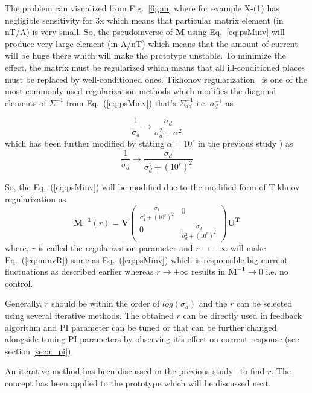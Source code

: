 The problem can visualized from Fig.~\ref{fig:m} where for example X-(1) has negligible sensitivity for 3x which means that particular matrix element (in nT/A) is very small. So, the pseudoinverse of $\bm{M}$ using Eq.~\ref{eq:psMinv} will produce very large element (in A/nT) which means that the amount of current will be huge there which will make the prototype unstable. To minimize the effect, the matrix must be regularized which means that all ill-conditioned places must be replaced  by well-conditioned ones.  Tikhonov regularization~\cite{tikhonov2013numerical,tikhonov_book,svd,svd3} is one of the most commonly used regularization methods which modifies the diagonal elements of $\Sigma^{-1}$ from Eq.~(\ref{eq:psMinv}) that's $\Sigma^{-1}_{dd}$ i.e. $\sigma_d^{-1}$ as

\begin{equation}
    \frac{1}{\sigma_d} \rightarrow \frac{\sigma_d}{\sigma_d^2+\alpha^2} 
\end{equation}
which has been further modified by stating $\alpha=10^r$ in the previous study \cite{bea}) as
\begin{equation}\label{eq:sigma}
    \frac{1}{\sigma_d} \rightarrow \frac{\sigma_d}{\sigma_d^2+(10^r)^2}
\end{equation}

So, the Eq.~(\ref{eq:psMinv}) will be modified due to the modified form of Tikhnov regularization as
\begin{equation}\label{eq:minvR}
    \bm{M^{-1}}(r) = \bm{V}\begin{pmatrix} 
\frac{\sigma_1}{\sigma_1^2+(10^r)^2} & 0 \\
0 & \frac{\sigma_d}{\sigma_d^2+(10^r)^2}
\end{pmatrix} \bm{U^T}
\end{equation}
where, $r$ is called the regularization parameter and  $r \rightarrow - \infty$ will make Eq.~(\ref{eq:minvR}) same as Eq.~(\ref{eq:psMinv}) which is responsible big current fluctuations as described earlier whereas $r \rightarrow + \infty$ results in $\bm{M^{-1}} \rightarrow 0$ i.e. no control.

Generally, $r$ should be within the order of $log(\sigma_{d})$ and the $r$ can be selected using several iterative methods. The obtained $r$ can be directly used in feedback algorithm and PI parameter can be tuned or that can be further changed alongside tuning PI parameters by observing it's effect on current response (see section \ref{sec:r_pi}).


An iterative method has been discussed in  the previous study~\cite{bea} to find $r$. The concept has been applied to the prototype which will be discussed next.

